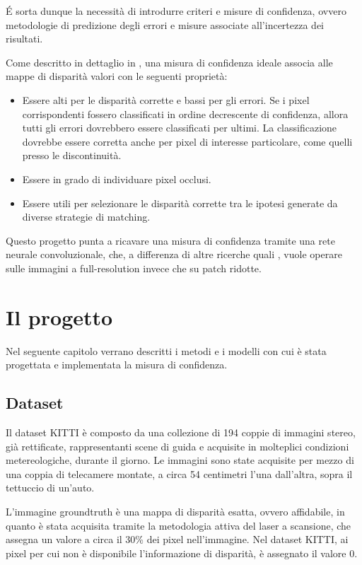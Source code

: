 \documentclass[12pt,a4paper]{report}
\begin{document}
\'E sorta dunque la necessità di introdurre criteri e misure di confidenza,
ovvero metodologie di predizione degli errori e misure associate all'incertezza
dei risultati.

Come descritto in dettaglio in  \cite{tesitosi}, una misura
di confidenza ideale associa alle mappe di disparità valori con le seguenti
proprietà:

\begin{itemize}
    \item Essere alti per le disparità corrette e bassi per gli errori. Se i 
        pixel corrispondenti fossero classificati in ordine decrescente di
        confidenza, allora tutti gli errori dovrebbero essere classificati per
        ultimi. La classificazione dovrebbe essere corretta anche per pixel di
        interesse particolare, come quelli presso le discontinuità.
    \item Essere in grado di individuare pixel occlusi. 
    \item Essere utili per  selezionare le disparità corrette tra le ipotesi
        generate da diverse strategie di matching.
\end{itemize}

Questo progetto punta a ricavare una misura di confidenza tramite una rete
neurale convoluzionale, che, a differenza di altre ricerche quali
\cite{BMVC2016_46}, vuole operare sulle immagini a full-resolution invece che
su patch ridotte.

\chapter{Il progetto}

Nel seguente capitolo verrano descritti i metodi e i modelli con cui è stata
progettata e implementata la misura di confidenza.


\section{Dataset}

Il dataset KITTI \cite{Geiger2012CVPR} è composto da una collezione di 194
coppie di immagini stereo, già rettificate, rappresentanti scene di guida e
acquisite in molteplici condizioni metereologiche, durante il giorno. Le
immagini sono state acquisite per mezzo di una coppia di telecamere montate, a
circa 54 centimetri l'una dall'altra, sopra il tettuccio di un'auto.

L'immagine groundtruth è una mappa di disparità esatta, ovvero affidabile, 
in quanto è stata acquisita tramite la metodologia attiva del laser a scansione,
che assegna un valore a circa il 30\% dei pixel nell'immagine. Nel dataset
KITTI, ai pixel per cui non è disponibile l'informazione di disparità, è 
assegnato il valore 0.
\end{document}
